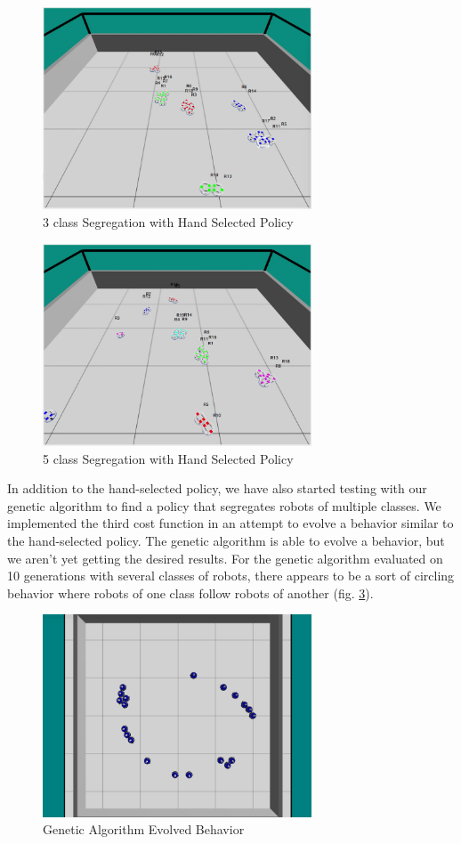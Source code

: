 \documentclass[conference]{IEEEtran}
\begin{document}
  \begin{figure}
    \centering
    \includegraphics[width=8cm]{handtuned-3class.png}
    \caption{3 class Segregation with Hand Selected Policy}
    \label{fig:handtuned-3class}
  \end{figure}

  \begin{figure}
    \centering
    \includegraphics[width=8cm]{handtuned-5class.png}
    \caption{5 class Segregation with Hand Selected Policy}
    \label{fig:handtuned-5class}
  \end{figure}

In addition to the hand-selected policy, we have also started testing with our genetic algorithm to find a policy that segregates robots of multiple classes.  We implemented the third cost function in an attempt to evolve a behavior similar to the hand-selected policy.  The genetic algorithm is able to evolve a behavior, but we aren't yet getting the desired results.  For the genetic algorithm evaluated on 10 generations with several classes of robots, there appears to be a sort of circling behavior where robots of one class follow robots of another (fig. \ref{fig:ga-multiclass}).

  \begin{figure}
    \centering
    \includegraphics[width=8cm]{evolved_multiclass.png}
    \caption{Genetic Algorithm Evolved Behavior}
    \label{fig:ga-multiclass}
  \end{figure}
\end{document}

